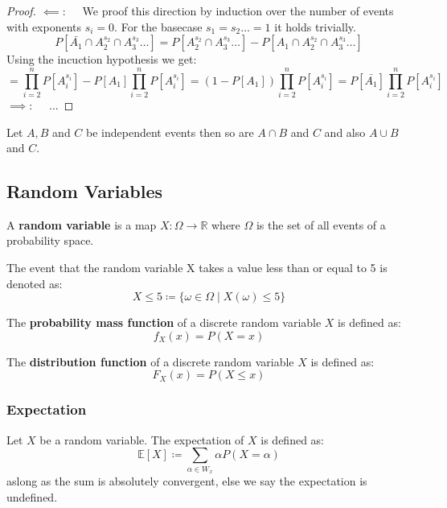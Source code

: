 \begin{proof}
    $\impliedby: \quad$ We proof this direction by induction over the number of events with exponents $s_i = 0$. For the basecase $s_1 = s_2 \dots = 1$ it holds trivially.
    $$P[\bar{A_1} \cap A_2^{s_2} \cap A_3^{s_3} \dots] = P[A_2^{s_2} \cap A_3^{s_3} \dots] - P[A_1 \cap A_2^{s_2} \cap A_3^{s_3} \dots]$$
    Using the incuction hypothesis we get:
    $$= \prod_{i=2}^n P[A_i^{s_i}] - P[A_1]\prod_{i=2}^n P[A_i^{s_i}] = (1-P[A_1])\prod_{i=2}^n P[A_i^{s_i}] = P[\bar{A_1}]\prod_{i=2}^n P[A_i^{s_i}]$$
    $\implies: \quad$ ...
\end{proof}

\begin{lemma}
    Let $A, B$ and $C$ be independent events then so are $A \cap B$ and $C$ and also $A \cup B$ and $C$.
\end{lemma}

\subsection{Random Variables}

\begin{definition}
    A \textbf{random variable } is a map $X: \Omega \to \mathbb{R}$ where $\Omega$ is the set of all events of a probability space.
\end{definition}

\begin{example}
    The event that the random variable X takes a value less than or equal to 5 is denoted as:
    $$X \leq 5 \coloneqq \{\omega \in \Omega \mid X(\omega) \leq 5\}$$
\end{example}

\begin{definition}
    The \textbf{probability mass function} of a discrete random variable $X$ is defined as:
    $$f_X(x) = P(X=x)$$
\end{definition}

\begin{definition}
    The \textbf{distribution function} of a discrete random variable $X$ is defined as:
    $$F_X(x) = P(X \leq x)$$
\end{definition}

\subsubsection{Expectation}

\begin{definition}
    Let $X$ be a random variable. The expectation of $X$ is defined as:
    $$
    \mathbb{E}[X] \coloneqq \sum_{\alpha \in W_x} \alpha P(X=\alpha)
    $$
    aslong as the sum is absolutely convergent, else we say the expectation is undefined.
\end{definition}

